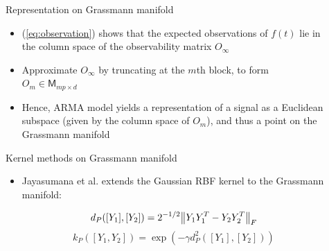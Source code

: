 \documentclass[final]{beamer}
\newlength{\sepwid}
\newlength{\onecolwid}
\begin{document}
\begin{frame}[t]
\begin{columns}[t]
\begin{column}{\onecolwid}
\end{column} %

\begin{column}{\sepwid}\end{column} %

\begin{column}{\onecolwid} %


\begin{block}{Representation on Grassmann manifold}
    \begin{itemize}
        \item (\ref{eq:observation}) shows that the expected observations of $f(t)$ lie in the
            column space of the observability matrix $O_\infty$

        \item Approximate $O_\infty$ by truncating at the $m$th block, to form $O_m \in
            \mathsf{M}_{mp \times d}$

        \item Hence, ARMA model yields a representation of a signal as a Euclidean subspace (given
            by the column space of $O_m$), and thus a point on the Grassmann manifold
    \end{itemize}
\end{block}


\begin{block}{Kernel methods on Grassmann manifold}
    \begin{itemize}
       

      

        \item Jayasumana et al. \cite{jayasumana_kernel_2015} extends the Gaussian RBF kernel to the
            Grassmann manifold:

            \begin{equation}
                d_P([Y_1], [Y_2]) = 2^{-1/2} \norm{Y_1Y_1^T - Y_2Y_2^T}_F
            \end{equation}
            \begin{equation}\label{eq:kernel}
                k_P([Y_1, Y_2]) = \exp(-\gamma d_P^2([Y_1], [Y_2]))
            \end{equation}


\end{itemize}
\end{block}
\end{column}
\end{columns}
\end{frame}
\end{document}
